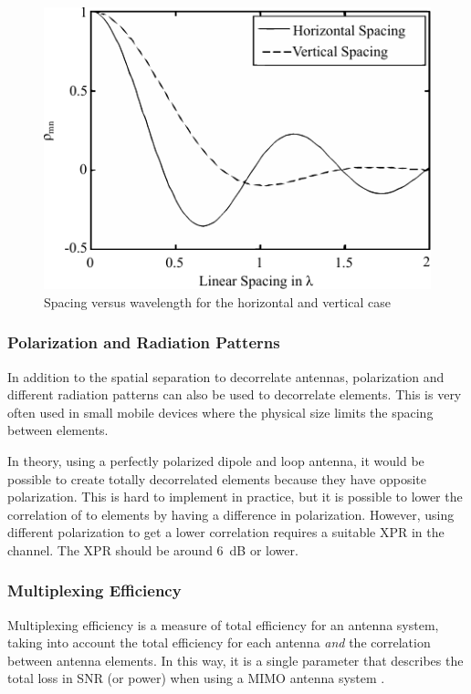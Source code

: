 \begin{figure}[htbp]
  \centering
  \includegraphics[scale=1.2]{img/analysis/mimoSpacing}
  \caption{Spacing versus wavelength for the horizontal and vertical case\cite{Tim2012Practical}}
  \label{fig:mimo-spacing}
\end{figure}

\subsubsection{Polarization and Radiation Patterns}
In addition to the spatial separation to decorrelate antennas, polarization and different radiation patterns can also be used to decorrelate elements. This is very often used in small mobile devices where the physical size limits the spacing between elements.  

In theory, using a perfectly polarized dipole and loop antenna, it would be possible to create totally decorrelated elements because they have opposite polarization. This is hard to implement in practice, but it is possible to lower the correlation of to elements by having a difference in polarization. However, using different polarization to get a lower correlation requires a suitable XPR in the channel. The XPR should be around \SI{6}{dB} or lower\cite{Tim2012Practical}. 

\subsubsection{Multiplexing Efficiency}
\label{sec:muxefficiency}

Multiplexing efficiency is a measure of total efficiency for an antenna system, taking into account the total efficiency for each antenna \emph{and} the correlation between antenna elements. In this way, it is a single parameter that describes the total loss in SNR (or power) when using a MIMO antenna system \cite{tian2011multiplexing}.

